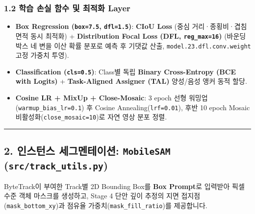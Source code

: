 \documentclass[10.5pt,a4paper]{article}
\begin{document}
\subsubsection{1.2 학습 손실 함수 및 최적화 Layer}
\begin{itemize}[leftmargin=1.5em,itemsep=2pt]
\item \textbf{Box Regression (\texttt{box=7.\allowbreak{}5}, \texttt{dfl=1.\allowbreak{}5})}: \textbf{CIoU Loss} (중심 거리·종횡비·겹침 면적 동시 최적화) + \textbf{Distribution Focal Loss (DFL, \texttt{reg\_\allowbreak{}max=16})} (바운딩 박스 네 변을 이산 확률 분포로 예측 후 기댓값 산출, \texttt{model.\allowbreak{}23.\allowbreak{}dfl.\allowbreak{}conv.\allowbreak{}weight} 고정 가중치 투영).
\item \textbf{Classification (\texttt{cls=0.\allowbreak{}5})}: Class별 독립 \textbf{Binary Cross-Entropy (BCE with Logits)} + \textbf{Task-Aligned Assigner (TAL)} 양성/음성 앵커 동적 할당.
\item \textbf{Cosine LR + MixUp + Close-Mosaic}: 3 epoch 선형 워밍업(\texttt{warmup\_\allowbreak{}bias\_\allowbreak{}lr=0.\allowbreak{}1}) 후 Cosine Annealing(\texttt{lrf=0.\allowbreak{}01}), 후반 10 epoch Mosaic 비활성화(\texttt{close\_\allowbreak{}mosaic=10})로 자연 영상 분포 정렬.
\end{itemize}

\par\noindent\rule{\textwidth}{0.4pt}\par\medskip

\subsection{2. 인스턴스 세그멘테이션: \texttt{MobileSAM} (\texttt{src/\allowbreak{}track\_\allowbreak{}utils.\allowbreak{}py})}

ByteTrack이 부여한 Track별 2D Bounding Box를 \textbf{Box Prompt}로 입력받아 픽셀 수준 객체 마스크를 생성하고, Stage 4 단안 깊이 추정의 지면 접지점(\texttt{mask\_\allowbreak{}bottom\_\allowbreak{}xy})과 점유율 가중치(\texttt{mask\_\allowbreak{}fill\_\allowbreak{}ratio})를 제공합니다.
\end{document}
